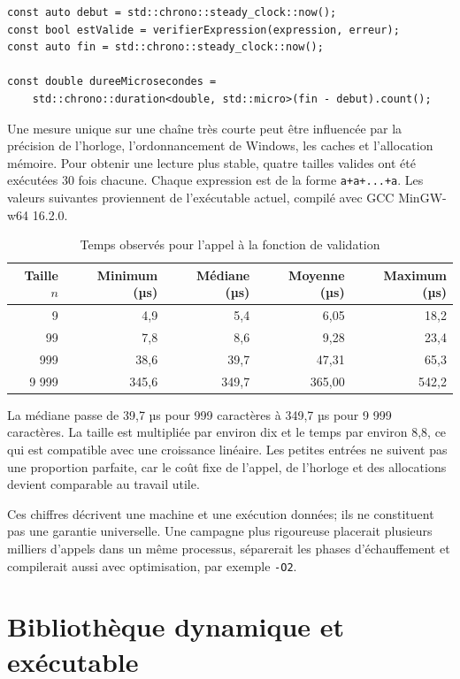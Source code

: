 \documentclass[11pt,a4paper]{article}
\begin{document}
\begin{lstlisting}[style=cppstyle,caption={Zone effectivement chronométrée}]
const auto debut = std::chrono::steady_clock::now();
const bool estValide = verifierExpression(expression, erreur);
const auto fin = std::chrono::steady_clock::now();

const double dureeMicrosecondes =
    std::chrono::duration<double, std::micro>(fin - debut).count();
\end{lstlisting}

Une mesure unique sur une chaîne très courte peut être influencée par la précision de l'horloge, l'ordonnancement de Windows, les caches et l'allocation mémoire. Pour obtenir une lecture plus stable, quatre tailles valides ont été exécutées 30 fois chacune. Chaque expression est de la forme \texttt{a+a+...+a}. Les valeurs suivantes proviennent de l'exécutable actuel, compilé avec GCC MinGW-w64 16.2.0.

\begin{table}[ht]
\centering
\caption{Temps observés pour l'appel à la fonction de validation}
\begin{tabular}{r r r r r}
\toprule
\textbf{Taille $n$} & \textbf{Minimum (µs)} & \textbf{Médiane (µs)} & \textbf{Moyenne (µs)} & \textbf{Maximum (µs)} \\
\midrule
9    & 4,9   & 5,4   & 6,05  & 18,2 \\
99   & 7,8   & 8,6   & 9,28  & 23,4 \\
999  & 38,6  & 39,7  & 47,31 & 65,3 \\
9 999 & 345,6 & 349,7 & 365,00 & 542,2 \\
\bottomrule
\end{tabular}
\end{table}

La médiane passe de 39,7 µs pour 999 caractères à 349,7 µs pour 9 999 caractères. La taille est multipliée par environ dix et le temps par environ 8,8, ce qui est compatible avec une croissance linéaire. Les petites entrées ne suivent pas une proportion parfaite, car le coût fixe de l'appel, de l'horloge et des allocations devient comparable au travail utile.

Ces chiffres décrivent une machine et une exécution données; ils ne constituent pas une garantie universelle. Une campagne plus rigoureuse placerait plusieurs milliers d'appels dans un même processus, séparerait les phases d'échauffement et compilerait aussi avec optimisation, par exemple \texttt{-O2}.

\section{Bibliothèque dynamique et exécutable}
\end{document}
